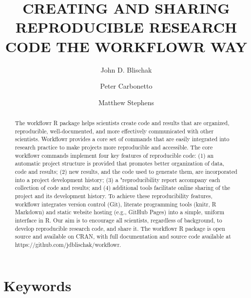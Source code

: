\documentclass[9pt,a4paper]{extarticle}
\begin{document}
\pagestyle{front}

\title{CREATING AND SHARING REPRODUCIBLE RESEARCH CODE THE WORKFLOWR
WAY}

\author[1]{John D. Blischak}

\author[1,2]{Peter Carbonetto}

\author[1,3]{Matthew Stephens}




\maketitle

\thispagestyle{front}

\begin{abstract}


The workflowr R package helps scientists create code and results that
are organized, reproducible, well-documented, and more effectively
communicated with other scientists. Workflowr provides a core set of
commands that are easily integrated into research practice to make
projects more reproducible and accessible. The core workflowr commands
implement four key features of reproducible code: (1) an automatic
project structure is provided that promotes better organization of data,
code and results; (2) new results, and the code used to generate them,
are incorporated into a project development history; (3) a
"reproducibility report accompany each collection of code and results;
and (4) additional tools facilitate online sharing of the project and
its development history. To achieve these reproducibility features,
workflowr integrates version control (Git), literate programming tools
(knitr, R Markdown) and static website hosting (e.g., GitHub Pages) into
a simple, uniform interface in R. Our aim is to encourage all
scientists, regardless of background, to develop reproducible research
code, and share it. The workflowr R package is open source and available
on CRAN, with full documentation and source code available at
https://github.com/jdblischak/workflowr.

\end{abstract}

\section*{Keywords}
\end{document}
